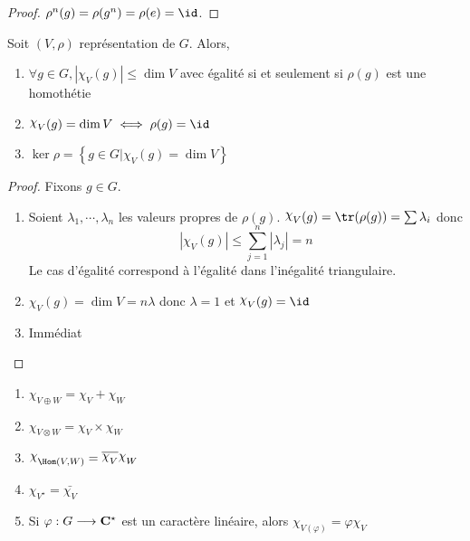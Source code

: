 \begin{proof}
    $\rho^n(g)=\rho(g^n)=\rho(e)=\id$.
\end{proof}

\begin{prop}
    Soit $(V, \rho)$ représentation de  $G$. Alors,  \begin{enumerate}
        \item $\forall  g \in  G, |\chi_V(g)|\leq \dim V$ avec égalité si et seulement si $\rho(g)$ est une homothétie
        \item $\chi_V(g)=\dim V \iff  \rho(g)=\id$
        \item $\ker \rho = \left\{ g \in  G | \chi_V(g)=\dim V \right\} $
    \end{enumerate}
\end{prop}

\begin{proof}
Fixons $g \in  G$. \begin{enumerate}
    \item Soient $\lambda_1, \cdots , \lambda_n$ les valeurs propres de $\rho(g)$.  $\chi_V(g)=\tr(\rho(g))=\sum \lambda_i$ donc \[|\chi_V(g)|\leq \sum_{j=1}^n|\lambda_j|=n\]
        Le cas d'égalité correspond à l'égalité dans l'inégalité triangulaire.
    \item $\chi_V(g)=\dim V=n\lambda$ donc $ \lambda=1$ et $\chi_V(g)=\id$
    \item Immédiat
\end{enumerate}
\end{proof}

\begin{prop}
\begin{enumerate}
    \item $\chi_{V\oplus W}=\chi_V+\chi_W$ 
    \item $\chi_{V\otimes W}=\chi_V\times \chi_W$
    \item  $\chi_{\Hom(V, W)}=\bar{\chi_V}\chi_W$
    \item $\chi_{V^\star}=\bar{\chi_V}$
\item Si $\varphi: G \longrightarrow  \mathbf C^\star$ est un caractère linéaire, alors $\chi_{V(\varphi)}=\varphi\chi_V$
\end{enumerate}
\end{prop}

